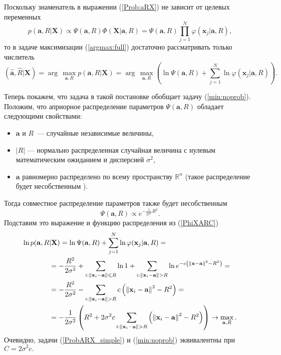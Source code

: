 \documentclass[12pt,a4paper]{article}
\def\le{\leqslant}
\def\Rn{\ensuremath{\mathbb{R}^n}}
\newcommand\mb[1]{\ensuremath{\boldsymbol{\mathbf{#1}}}}
\def\argmax{\arg\,\max} %
\newcommand\cbr[1]{\left(#1\right)} %
\newcommand\modul[1]{\left|#1\right|}
\newcommand\norm[1]{\ensuremath{\left\|{#1}\right\|}}
\begin{document}
	Поскольку знаменатель в выражении (\ref{Prob:aRX}) не зависит от целевых переменных 
	$$p(\mb a,R|\mb X) 
		\propto \Psi(\mb a,R) \Phi(\mb X|\mb a,R) 
		=  \Psi(\mb a,R) \prod_{j=1}^N \varphi(\mb x_j|\mb a,R),$$
	то в задаче максимизации (\ref{argmax:full}) достаточно рассматривать только числитель
	$$\cbr{\hat{\mb a},\hat R|\mb X}
		= \argmax_{\mb a,R} p(\mb a,R|\mb X) 
		= \argmax_{\mb a,R} \cbr{\ln\Psi(\mb a,R) + \sum_{j=1}^N\ln\varphi(\mb x_j|\mb a,R)}. $$

	Теперь покажем, что задача в такой постановке обобщает задачу (\ref{min:noprob}). 
	Положим, что априорное распределение параметров $\Psi(\mb a,R)$ обладает следующими свойствами:
	\begin{itemize}
	 	\item $\mb a$ и $R$~--- случайные независимые величины,
	 	\item $\modul{R}$ --- нормально распределенная случайная величина с нулевым математическим ожиданием и дисперсией $\sigma^2$,
	 	\item $\mb a$ равномерно распределено по всему пространству $\Rn$ (такое распределение будет несобственным \cite{Groot1974}).
	 \end{itemize} 
	 Тогда совместное распределение параметров также будет несобственным 
	 $$\Psi(\mb a,R)\propto e^{-\frac1{2\sigma^2}R^2}.$$
	 Подставим это выражение и функцию распределения из (\ref{PhiXARC})
	 \begin{align}
	 	\label{ProbARX_simple}
	 	\ln p(\mb a,R&|\mb X) 
	 		=	\ln\Psi(\mb a,R) + \sum_{j=1}^N\ln\varphi(\mb x_j|\mb a,R) =\notag \\
	 		&= 	-\frac{R^2}{2\sigma^2} + \sum_{i: \norm{\mb x_i - \mb a} \le R} \ln 1 
	 			+ \sum_{i: \norm{\mb x_i - \mb a} > R} \ln e^{-c \cbr{\norm{\mb x-\mb a}^2-R^2}}  = \notag \\
	 		&= -\frac{R^2}{2\sigma^2} - \sum_{i: \norm{\mb x_i - \mb a} > R} c\cbr{\norm{\mb x_i - \mb a}^2 - R^2} = \notag \\
	 		&= -\frac1{2\sigma^2}\cbr{R^2 + 2\sigma^2 c\sum_{i: \norm{\mb x_i - \mb a} > R} \cbr{\norm{\mb x_i - \mb a}^2 -R^2}} \to \max_{\mb a, R}.
	 \end{align}
	 Очевидно, задачи (\ref{ProbARX_simple}) и (\ref{min:noprob}) эквивалентны при $C = 2\sigma^2 c.$
\end{document}
